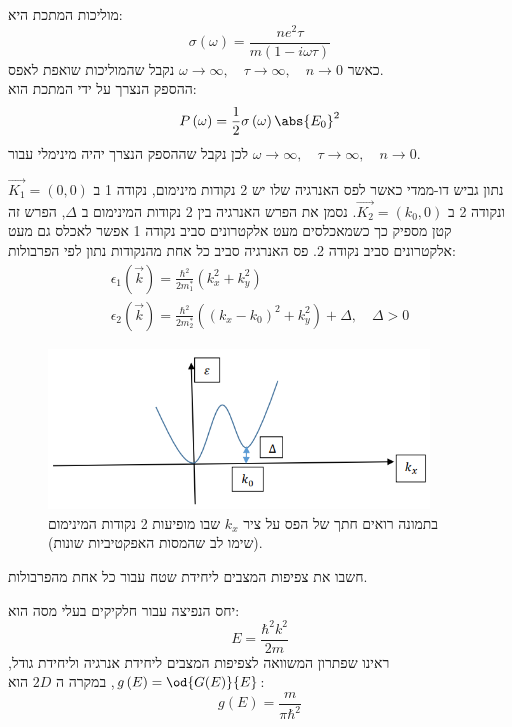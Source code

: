 \documentclass{article}
\begin{document}
\begin{Answer}
מוליכות המתכת היא:
$$\sigma\left( \omega \right)=\frac{ne^{2}\tau}{m\left( 1-i\omega\tau \right)}$$
כאשר $\omega\to\infty,\quad \tau\to\infty,\quad n\to 0$ נקבל שהמוליכות שואפת לאפס.\\
ההספק הנצרך על ידי המתכת הוא:
$$P\left( \omega \right)=\frac{1}{2}\sigma\left( \omega \right)\abs{E_{0}}^{2}$$
לכן נקבל שההספק הנצרך יהיה מינימלי עבור $\omega\to\infty,\quad \tau\to\infty,\quad n\to 0$.
\end{Answer}\newpage
\begin{Question}
נתון גביש דו-ממדי כאשר לפס האנרגיה שלו יש 2 נקודות מינימום, נקודה 1 ב $\vec{K_{1}}=\left( 0,0 \right)$ ונקודה 2 ב $\vec{K_{2}}=\left( k_{0},0 \right)$. נסמן את הפרש האנרגיה בין 2 נקודות המינימום ב $\Delta$, הפרש זה קטן מספיק כך כשמאכלסים מעט אלקטרונים סביב נקודה 1 אפשר לאכלס גם מעט אלקטרונים סביב נקודה 2. פס האנרגיה סביב כל אחת מהנקודות נתון לפי הפרבולות:
\begin{gather*}
    \epsilon_{1}\left( \vec{k} \right)=\frac{\hbar^{2}}{2m_{1}^{*}}\left( k_{x}^{2}+k_{y}^{2} \right)\\
    \epsilon_{2}\left( \vec{k} \right)=\frac{\hbar^{2}}{2m_{2}^{*}}\left( \left( k_{x}-k_{0} \right)^{2}+k_{y}^{2} \right)+\Delta,\quad \Delta>0
\end{gather*}
\begin{figure}[H]
\centering
\includegraphics[width=0.9\textwidth]{images/Q6.png}
\caption{
בתמונה רואים חתך של הפס על ציר $k_{x}$ שבו מופיעות 2 נקודות המינימום (שימו לב שהמסות האפקטיביות שונות).}
\end{figure}
\begin{SubQuestion}
חשבו את צפיפות המצבים ליחידת שטח עבור כל אחת מהפרבולות.
\end{SubQuestion}
\begin{SubAnswer}
    יחס הנפיצה עבור חלקיקים בעלי מסה הוא:
    $$E=\frac{\hbar^{2}k^{2}}{2m}$$
    ראינו שפתרון המשוואה לצפיפות המצבים ליחידת אנרגיה וליחידת גודל, $g\left( E \right) = \od{G(E)}{E}$, במקרה ה $2D$ הוא:
    $$g\left( E \right)=\frac{m}{\pi \hbar^{2}}$$

\end{SubAnswer}
\end{Question}
\end{document}
